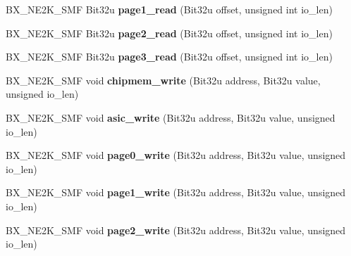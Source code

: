 \begin{DoxyCompactItemize}
\item 
\hypertarget{classbx__ne2k__c_ab9bdf189d8a6dff031887b28131e98da}{B\-X\-\_\-\-N\-E2\-K\-\_\-\-S\-M\-F Bit32u {\bfseries page1\-\_\-read} (Bit32u offset, unsigned int io\-\_\-len)}\label{classbx__ne2k__c_ab9bdf189d8a6dff031887b28131e98da}

\item 
\hypertarget{classbx__ne2k__c_a22f2dde1a63d5e5ab55a7e3393f3fd2b}{B\-X\-\_\-\-N\-E2\-K\-\_\-\-S\-M\-F Bit32u {\bfseries page2\-\_\-read} (Bit32u offset, unsigned int io\-\_\-len)}\label{classbx__ne2k__c_a22f2dde1a63d5e5ab55a7e3393f3fd2b}

\item 
\hypertarget{classbx__ne2k__c_aa2d8668b402a538b0c6d088545f5597e}{B\-X\-\_\-\-N\-E2\-K\-\_\-\-S\-M\-F Bit32u {\bfseries page3\-\_\-read} (Bit32u offset, unsigned int io\-\_\-len)}\label{classbx__ne2k__c_aa2d8668b402a538b0c6d088545f5597e}

\item 
\hypertarget{classbx__ne2k__c_a2ef4a2eabd25fbe86580a88ed07d907b}{B\-X\-\_\-\-N\-E2\-K\-\_\-\-S\-M\-F void {\bfseries chipmem\-\_\-write} (Bit32u address, Bit32u value, unsigned io\-\_\-len)}\label{classbx__ne2k__c_a2ef4a2eabd25fbe86580a88ed07d907b}

\item 
\hypertarget{classbx__ne2k__c_ae4a9493baea04f813f7af049f0cea4ee}{B\-X\-\_\-\-N\-E2\-K\-\_\-\-S\-M\-F void {\bfseries asic\-\_\-write} (Bit32u address, Bit32u value, unsigned io\-\_\-len)}\label{classbx__ne2k__c_ae4a9493baea04f813f7af049f0cea4ee}

\item 
\hypertarget{classbx__ne2k__c_a2ec128e132867de075b33f521f6966e5}{B\-X\-\_\-\-N\-E2\-K\-\_\-\-S\-M\-F void {\bfseries page0\-\_\-write} (Bit32u address, Bit32u value, unsigned io\-\_\-len)}\label{classbx__ne2k__c_a2ec128e132867de075b33f521f6966e5}

\item 
\hypertarget{classbx__ne2k__c_a071c0490d1c7e4b520c8b99db450986c}{B\-X\-\_\-\-N\-E2\-K\-\_\-\-S\-M\-F void {\bfseries page1\-\_\-write} (Bit32u address, Bit32u value, unsigned io\-\_\-len)}\label{classbx__ne2k__c_a071c0490d1c7e4b520c8b99db450986c}

\item 
\hypertarget{classbx__ne2k__c_a696814dd7e45cd97fc87c9129e478424}{B\-X\-\_\-\-N\-E2\-K\-\_\-\-S\-M\-F void {\bfseries page2\-\_\-write} (Bit32u address, Bit32u value, unsigned io\-\_\-len)}\label{classbx__ne2k__c_a696814dd7e45cd97fc87c9129e478424}


\end{DoxyCompactItemize}
